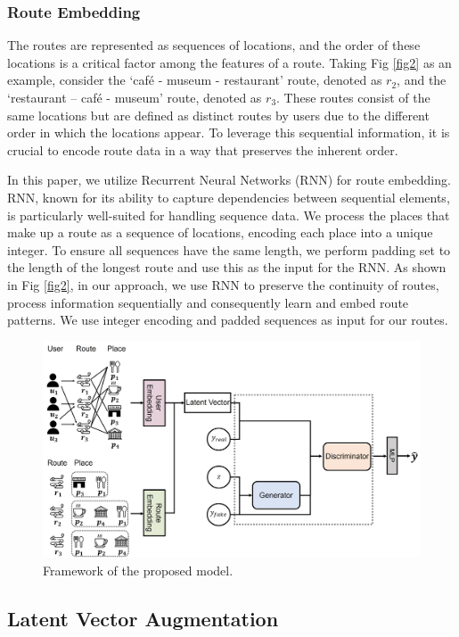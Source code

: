 \documentclass[]{article}
\begin{document}
\subsubsection*{Route Embedding}

The routes are represented as sequences of locations, and the order of these locations is a critical factor among the features of a route. Taking Fig \ref{fig2} as an example, consider the `café - museum - restaurant' route, denoted as $r_2$, and the `restaurant – café - museum' route, denoted as $r_3$. These routes consist of the same locations but are defined as distinct routes by users due to the different order in which the locations appear. To leverage this sequential information, it is crucial to encode route data in a way that preserves the inherent order. 

In this paper, we utilize Recurrent Neural Networks (RNN) for route embedding. RNN, known for its ability to capture dependencies between sequential elements, is particularly well-suited for handling sequence data. We process the places that make up a route as a sequence of locations, encoding each place into a unique integer. To ensure all sequences have the same length, we perform padding set to the length of the longest route and use this as the input for the RNN. As shown in Fig \ref{fig2}, in our approach, we use RNN to preserve the continuity of routes, process information sequentially and consequently learn and embed route patterns. We use integer encoding and padded sequences as input for our routes. 
\begin{figure}[htb!]
	\centering
	\includegraphics[width=1\linewidth]{fig/framework_5.jpg}
	\hfil
	\caption{Framework of the proposed model.}
	\label{fig3}
\end{figure}

\subsection{Latent Vector Augmentation}
\end{document}
